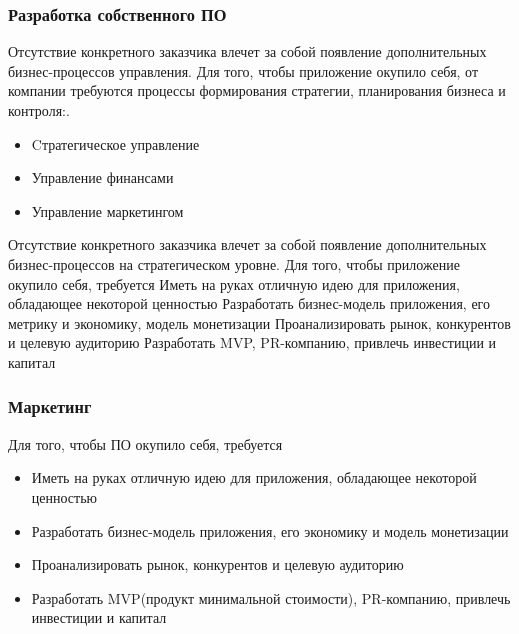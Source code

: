 \documentclass{../industrial-development}
\begin{document}
\begin{frame} \frametitle{Разработка собственного ПО}
Отсутствие конкретного заказчика влечет за собой появление дополнительных бизнес-процессов \alert{управления}. Для того, чтобы приложение окупило себя, от компании требуются процессы \alert{формирования стратегии, планирования бизнеса и контроля:}.
\begin{itemize}
	\item Cтратегическое управление 
	\item Управление финансами  
	\item Управление маркетингом
\end{itemize}
\end{frame}
Отсутствие конкретного заказчика влечет за собой появление дополнительных бизнес-процессов на стратегическом уровне. Для того, чтобы приложение окупило себя, требуется 
Иметь на руках отличную идею для приложения, обладающее некоторой ценностью
Разработать бизнес-модель приложения, его метрику и экономику, модель монетизации
Проанализировать рынок, конкурентов и целевую аудиторию
Разработать MVP, 
PR-компанию, привлечь инвестиции и капитал

\begin{frame} \frametitle{Маркетинг}
Для того, чтобы ПО окупило себя, требуется 
\begin{itemize}
	\item Иметь на руках отличную идею для приложения, обладающее некоторой ценностью
	\item Разработать бизнес-модель приложения, его экономику и модель монетизации
	\item Проанализировать рынок, конкурентов и целевую аудиторию
	\item Разработать MVP(продукт минимальной стоимости), PR-компанию, привлечь инвестиции и капитал
\end{itemize}
\end{frame}
\end{document}
